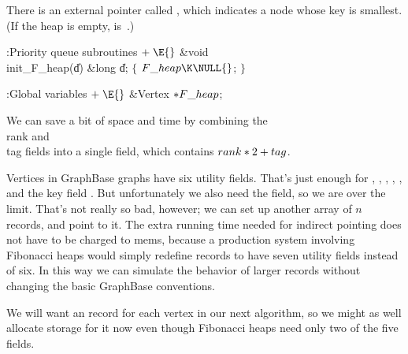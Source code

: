 There is an external pointer called , which indicates a node
whose key is smallest. (If the heap is empty,  is~\PB{$%
\NULL$}.)

\Y\B\4:Priority queue subroutines\X${}\mathrel+\E{}$\6
\1\1\&{void} \\{init\_F\_heap}(\|d)\6
\&{long} \|d;\2\2\6
${}\{{}$\5
\1${}\\{F\_heap}\K\NULL{}$;\5
${}\}{}$\2\par
\fi

\B{}:Global variables\X${}\mathrel+\E{}$\6
\&{Vertex} ${}{*}\\{F\_heap}{}$;\par
\fi

We can save a bit of space and time by combining the \\{rank} and \\{tag}
fields into a single  field, which contains $\\{rank}*2+%
\\{tag}$.

Vertices in GraphBase graphs have six utility fields. That's just enough
for , , , , , and the key field
. But unfortunately we also need the  field, so
we are over the limit. That's not really so bad, however; we
can set up another array of $n$ records, and point to it. The
extra running time needed for indirect pointing does not have to
be charged to mems, because a production system involving Fibonacci
heaps would simply redefine  records to have seven utility
fields instead of six. In this way we can simulate the behavior of larger
records without changing the basic GraphBase conventions.

We will want an  record for each vertex in our next algorithm,
so we might as well allocate storage for it now even though Fibonacci
heaps need only two of the five fields.


